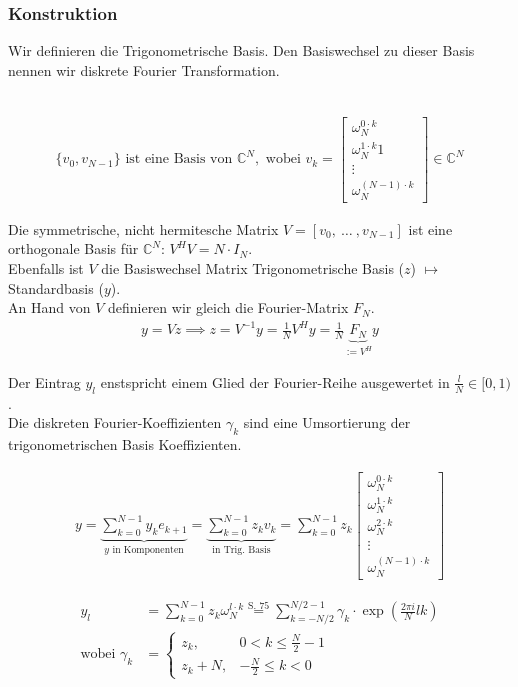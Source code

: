 \subsubsection{Konstruktion}

Wir definieren die Trigonometrische Basis. Den Basiswechsel zu dieser Basis nennen wir diskrete Fourier Transformation.

\\ 
\begin{align*}
    \{v_0, v_{N-1}\} \text{ ist eine Basis von } \mathbb{C}^N, \text{ wobei } v_k = 
    \begin{bmatrix}
        \omega_N^{0\cdot k} \\ \omega_N^{1\cdot k}1 \\ \vdots \\ \omega_N^{(N-1)\cdot k}
    \end{bmatrix} 
    \in \mathbb{C}^N
\end{align*}

Die symmetrische, nicht hermitesche Matrix $V = [v_0,\ \ldots\ , v_{N-1}]$ ist eine orthogonale Basis für $\mathbb{C}^N$: $V^HV = N\cdot I_N$.\\
Ebenfalls ist $V$ die Basiswechsel Matrix Trigonometrische Basis ($z$) $\mapsto$ Standardbasis ($y$).\\ 
An Hand von $V$ definieren wir gleich die Fourier-Matrix $F_N$.
\begin{align*}
    y = Vz \implies z = V^{-1}y = \frac{1}{N}V^Hy = \frac{1}{N}\underbrace{F_N}_{:= V^H} y
\end{align*}

Der Eintrag $y_l$ enstspricht einem Glied der Fourier-Reihe ausgewertet in $\frac{l}{N} \in [0,1)$. \\
Die diskreten Fourier-Koeffizienten $\gamma_k$ sind eine Umsortierung der trigonometrischen Basis Koeffizienten.
\begin{multicols}{2}
\begin{align*}
    y = \underbrace{\sum_{k=0}^{N-1} y_k e_{k+1}}_{y \text{ in Komponenten}} = \underbrace{\sum_{k=0}^{N-1} z_k v_k}_{\text{in Trig. Basis}} = \sum_{k=0}^{N-1} z_k \begin{bmatrix}
        \omega_N^{0 \cdot k} \\ \omega_N^{1 \cdot k} \\ \omega_N^{2 \cdot k} \\ \vdots \\ \omega_N^{(N-1) \cdot k}
    \end{bmatrix}
\end{align*}
\newcolumn

\begin{align*}
    y_l &= \sum_{k=0}^{N-1} z_k \omega_N^{l \cdot k} \overset{\text{S. 75}}{=} \sum_{k=-N/2}^{N/2-1} \gamma_k \cdot \exp(\frac{2\pi i}{N}lk) \\
    \text{wobei }\gamma_k &= \begin{cases}
        z_k,   & 0 < k \leq \frac{N}{2}-1 \\
        z_k+N, & -\frac{N}{2} \leq k < 0
    \end{cases}
\end{align*}
\end{multicols}

